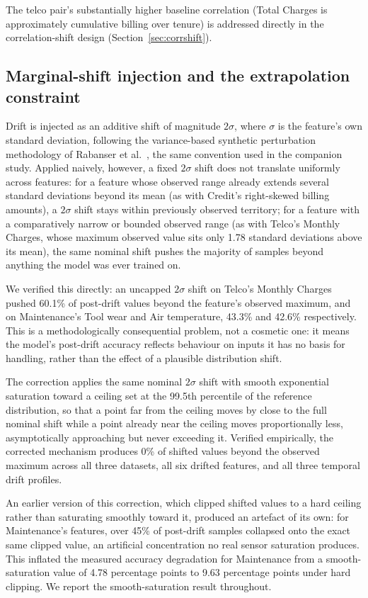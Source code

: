 \documentclass[conference]{IEEEtran}
\begin{document}
The telco pair's substantially higher baseline correlation (Total Charges is approximately cumulative billing over tenure) is addressed directly in the correlation-shift design (Section~\ref{sec:corrshift}).

\subsection{Marginal-shift injection and the extrapolation constraint}
\label{sec:extrapolation}

Drift is injected as an additive shift of magnitude $2\sigma$, where $\sigma$ is the feature's own standard deviation, following the variance-based synthetic perturbation methodology of Rabanser et al.~\cite{rabanser2019}, the same convention used in the companion study. Applied naively, however, a fixed $2\sigma$ shift does not translate uniformly across features: for a feature whose observed range already extends several standard deviations beyond its mean (as with Credit's right-skewed billing amounts), a $2\sigma$ shift stays within previously observed territory; for a feature with a comparatively narrow or bounded observed range (as with Telco's Monthly Charges, whose maximum observed value sits only 1.78 standard deviations above its mean), the same nominal shift pushes the majority of samples beyond anything the model was ever trained on.

We verified this directly: an uncapped $2\sigma$ shift on Telco's Monthly Charges pushed 60.1\% of post-drift values beyond the feature's observed maximum, and on Maintenance's Tool wear and Air temperature, 43.3\% and 42.6\% respectively. This is a methodologically consequential problem, not a cosmetic one: it means the model's post-drift accuracy reflects behaviour on inputs it has no basis for handling, rather than the effect of a plausible distribution shift.

The correction applies the same nominal $2\sigma$ shift with smooth exponential saturation toward a ceiling set at the 99.5th percentile of the reference distribution, so that a point far from the ceiling moves by close to the full nominal shift while a point already near the ceiling moves proportionally less, asymptotically approaching but never exceeding it. Verified empirically, the corrected mechanism produces 0\% of shifted values beyond the observed maximum across all three datasets, all six drifted features, and all three temporal drift profiles.

An earlier version of this correction, which clipped shifted values to a hard ceiling rather than saturating smoothly toward it, produced an artefact of its own: for Maintenance's features, over 45\% of post-drift samples collapsed onto the exact same clipped value, an artificial concentration no real sensor saturation produces. This inflated the measured accuracy degradation for Maintenance from a smooth-saturation value of 4.78 percentage points to 9.63 percentage points under hard clipping. We report the smooth-saturation result throughout.
\end{document}
